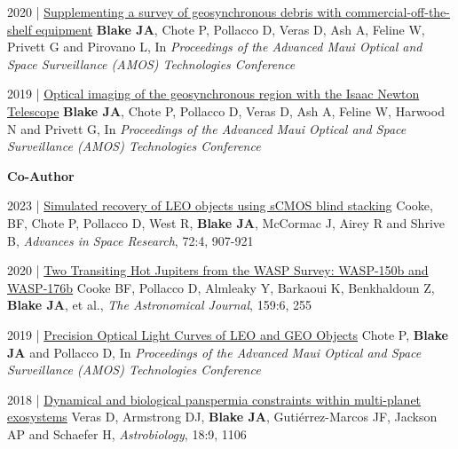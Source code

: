 \documentclass[10pt,a4paper]{altacv}
\begin{document}
\smallskip

\small
2020 | \href{https://www.researchgate.net/publication/344329639_Supplementing_a_survey_of_geosynchronous_debris_with_commercial-off-the-shelf_equipment}{Supplementing a survey of geosynchronous debris with commercial-off-the-shelf equipment}
\textbf{Blake JA}, Chote P, Pollacco D, Veras D, Ash A, Feline W, Privett G and Pirovano L, In \textit{Proceedings of the Advanced Maui Optical and Space Surveillance (AMOS) Technologies Conference}

\smallskip

\small
2019 | \href{https://www.researchgate.net/publication/338337216_Optical_imaging_of_faint_geosynchronous_debris_with_the_Isaac_Newton_Telescope}{Optical imaging of the geosynchronous region with the Isaac Newton Telescope}
\textbf{Blake JA}, Chote P, Pollacco D, Veras D, Ash A, Feline W, Harwood N and Privett G, In \textit{Proceedings of the Advanced Maui Optical and Space Surveillance (AMOS) Technologies Conference}

\divider

\normalsize \textbf{Co-Author} 

\medskip

\small
2023 | \href{https://www.sciencedirect.com/science/article/pii/S0273117723003502?dgcid=rss_sd_all}{Simulated recovery of LEO objects using sCMOS blind stacking}
Cooke, BF, Chote P, Pollacco D, West R, \textbf{Blake JA}, McCormac J, Airey R and Shrive B, \textit{Advances in Space Research}, 72:4, 907-921

\smallskip

\small
2020 | \href{https://iopscience.iop.org/article/10.3847/1538-3881/ab88db/meta}{Two Transiting Hot Jupiters from the WASP Survey: WASP-150b and WASP-176b}
Cooke BF, Pollacco D, Almleaky Y, Barkaoui K, Benkhaldoun Z, \textbf{Blake JA}, et al., \textit{The Astronomical Journal}, 159:6, 255

\smallskip 

\small
2019 | \href{https://www.researchgate.net/publication/338450520_Precision_Optical_Light_Curves_of_LEO_and_GEO_Objects}{Precision Optical Light Curves of LEO and GEO Objects}
Chote P, \linebreak\textbf{Blake JA} and Pollacco D, In \textit{Proceedings of the Advanced Maui Optical and Space Surveillance (AMOS) Technologies Conference}

\smallskip

\small
2018 | \href{https://www.liebertpub.com/doi/abs/10.1089/ast.2017.1786}{Dynamical and biological panspermia constraints within multi-planet exosystems}
Veras D, Armstrong DJ, \textbf{Blake JA}, Guti{\'e}rrez-Marcos JF, Jackson AP and Schaefer H, \textit{Astrobiology}, 18:9, 1106
\end{document}
